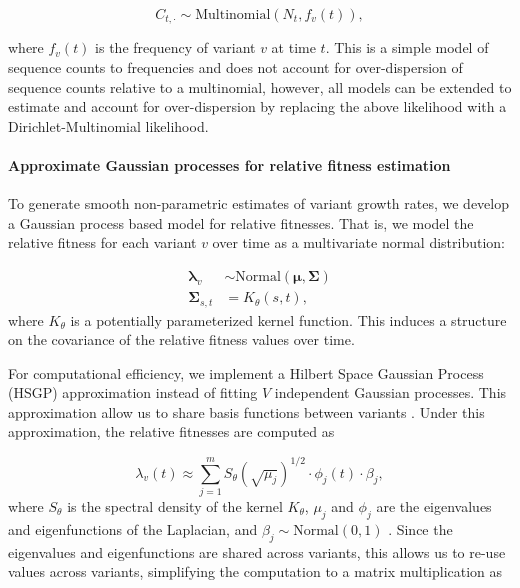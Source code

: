\documentclass[11pt,oneside,letterpaper]{article}
\renewcommand{\vec}[1]{\boldsymbol{#1}}
\begin{document}
\begin{equation*}
    C_{t, \cdot} \sim \text{Multinomial}(N_{t}, f_{v}(t)),
\end{equation*}

where $f_{v}(t)$ is the frequency of variant $v$ at time $t$.
This is a simple model of sequence counts to frequencies and does not account for over-dispersion of sequence counts relative to a multinomial, however, all models can be extended to estimate and account for over-dispersion by replacing the above likelihood with a Dirichlet-Multinomial likelihood.

\paragraph{Approximate Gaussian processes for relative fitness estimation}%

To generate smooth non-parametric estimates of variant growth rates, we develop a Gaussian process based model for relative fitnesses.
That is, we model the relative fitness for each variant $v$ over time as a multivariate normal distribution:

\begin{align*}
    \vec{\lambda}_{v} &\sim \text{Normal}(\vec{\mu}, \vec{\Sigma})\\
    \vec{\Sigma}_{s, t} &= K_{\theta}(s, t),
\end{align*}
where $K_{\theta}$ is a potentially parameterized kernel function.
This induces a structure on the covariance of the relative fitness values over time.


For computational efficiency, we implement a Hilbert Space Gaussian Process (HSGP) approximation instead of fitting $V$ independent Gaussian processes.
This approximation allow us to share basis functions between variants \cite{riutortmayol2022practical}.
Under this approximation, the relative fitnesses are computed as

\begin{equation}
    \lambda_{v}(t) \approx \sum_{j=1}^{m} S_{\theta}(\sqrt{\mu_{j}})^{1/2} \cdot \phi_{j}(t) \cdot \beta_{j},
\end{equation}
where $S_{\theta}$ is the spectral density of the kernel $K_\theta$, $\mu_{j}$ and $\phi_{j}$ are the eigenvalues and eigenfunctions of the Laplacian, and $\beta_{j} \sim \text{Normal}(0,1)$ \cite{riutortmayol2022practical}.
Since the eigenvalues and eigenfunctions are shared across variants, this allows us to re-use values across variants, simplifying the computation to a matrix multiplication as
\end{document}
